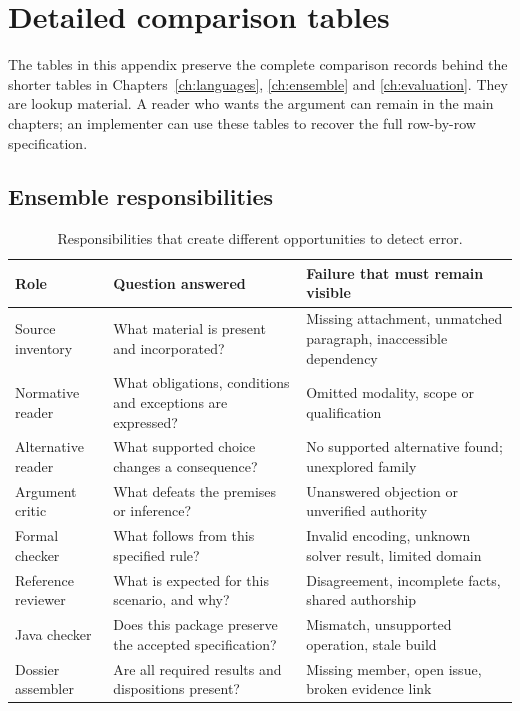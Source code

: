 \documentclass[12pt,a4paper,oneside,openany]{book}
\begin{document}
\chapter{Detailed comparison tables}
\label{app:detailed-tables}

The tables in this appendix preserve the complete comparison records behind the
shorter tables in Chapters~\ref{ch:languages}, \ref{ch:ensemble} and
\ref{ch:evaluation}. They are lookup material. A reader who wants the argument
can remain in the main chapters; an implementer can use these tables to recover
the full row-by-row specification.

\section{Ensemble responsibilities}
\begin{table}[htbp]
\centering\small
\caption{Responsibilities that create different opportunities to detect error.}
\label{tab:ensemble-roles-detail}
\begin{tabularx}{\textwidth}{P{31mm}YY}
\toprule
Role & Question answered & Failure that must remain visible\\
\midrule
Source inventory & What material is present and incorporated? & Missing attachment, unmatched paragraph, inaccessible dependency\\
Normative reader & What obligations, conditions and exceptions are expressed? & Omitted modality, scope or qualification\\
Alternative reader & What supported choice changes a consequence? & No supported alternative found; unexplored family\\
Argument critic & What defeats the premises or inference? & Unanswered objection or unverified authority\\
Formal checker & What follows from this specified rule? & Invalid encoding, unknown solver result, limited domain\\
Reference reviewer & What is expected for this scenario, and why? & Disagreement, incomplete facts, shared authorship\\
Java checker & Does this package preserve the accepted specification? & Mismatch, unsupported operation, stale build\\
Dossier assembler & Are all required results and dispositions present? & Missing member, open issue, broken evidence link\\
\bottomrule
\end{tabularx}
\end{table}
\end{document}
